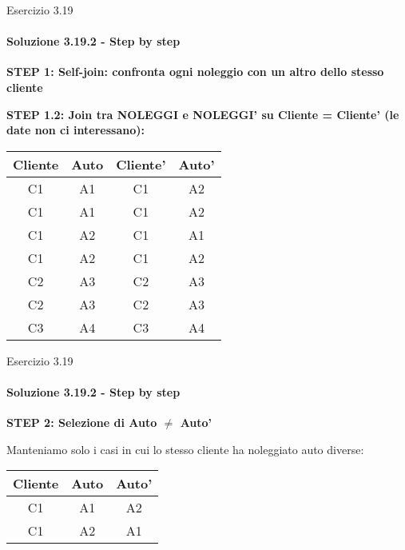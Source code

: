 %
\begin{frame}{Esercizio 3.19}
    \framesubtitle{Soluzione 3.19.2 - Step by step}
    \vspace*{-1cm}

    {\small \textbf{STEP 1: Self-join: confronta ogni noleggio con un altro dello stesso cliente}}
    
    \vspace{.3cm}

    {\small \textbf{STEP 1.2: Join tra NOLEGGI e NOLEGGI' su Cliente = Cliente' (le date non ci interessano):}}
    
    \vspace{.1cm}

    \small
    
    \centering
    
    \begin{tabular}{|c|c|c|c|}
    \hline
    \rowcolor{cyan!30} Cliente & Auto & Cliente' & Auto' \\
    \hline
    C1 & A1 & C1 & A2 \\
    \hline
    C1 & A1 & C1 & A2 \\
    \hline
    C1 & A2 & C1 & A1 \\
    \hline
    C1 & A2 & C1 & A2 \\
    \hline
    C2 & A3 & C2 & A3 \\
    \hline
    C2 & A3 & C2 & A3 \\
    \hline
    C3 & A4 & C3 & A4 \\
    \hline
    \end{tabular}
\end{frame}
%
\begin{frame}{Esercizio 3.19}
    \framesubtitle{Soluzione 3.19.2 - Step by step}
    \vspace*{-1cm}

    {\small \textbf{STEP 2: Selezione di Auto $\neq$ Auto'}}
    
    \vspace{.3cm}

    {\small Manteniamo solo i casi in cui lo stesso cliente ha noleggiato auto diverse:}
    
    \vspace{.1cm}

    \small
    
    \centering
    
    \begin{tabular}{|c|c|c|}
    \hline
    \rowcolor{cyan!30} Cliente & Auto & Auto' \\
    \hline
    C1 & A1 & A2 \\
    \hline
    C1 & A2 & A1 \\
    \hline
    \end{tabular}
\end{frame}

